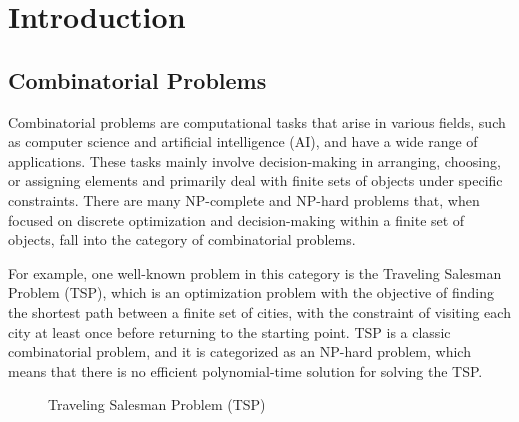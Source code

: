 
\chapter{Introduction}

\section{Combinatorial Problems}
Combinatorial problems are computational tasks that arise in various fields, such as computer science and artificial intelligence (AI), and have a wide range of applications. These tasks mainly involve decision-making in arranging, choosing, or assigning elements and primarily deal with finite sets of objects under specific constraints. There are many NP-complete and NP-hard problems that, when focused on discrete optimization and decision-making within a finite set of objects, fall into the category of combinatorial problems.

For example, one well-known problem in this category is the Traveling Salesman Problem (TSP), which is an optimization problem with the objective of finding the shortest path between a finite set of cities, with the constraint of visiting each city at least once before returning to the starting point. TSP is a classic combinatorial problem, and it is categorized as an NP-hard problem, which means that there is no efficient polynomial-time solution for solving the TSP.

\begin{figure}[h]
        \begin{center}
        \end{center}
        \caption{Traveling Salesman Problem (TSP)}
\end{figure}

